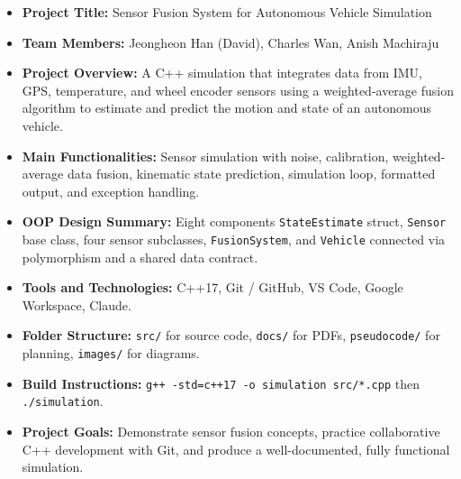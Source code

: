 \documentclass[a4paper,11pt]{article}
\begin{document}
\begin{itemize}[leftmargin=1.5cm]
\item \textbf{Project Title:} Sensor Fusion System for Autonomous Vehicle Simulation
\item \textbf{Team Members:} Jeongheon Han (David), Charles Wan, Anish Machiraju
\item \textbf{Project Overview:} A C++ simulation that integrates data from IMU, GPS, temperature, and wheel encoder sensors using a weighted-average fusion algorithm to estimate and predict the motion and state of an autonomous vehicle.
\item \textbf{Main Functionalities:} Sensor simulation with noise, calibration, weighted-average data fusion, kinematic state prediction, simulation loop, formatted output, and exception handling.
\item \textbf{OOP Design Summary:} Eight components \texttt{StateEstimate} struct, \texttt{Sensor} base class, four sensor subclasses, \texttt{FusionSystem}, and \texttt{Vehicle} connected via polymorphism and a shared data contract.
\item \textbf{Tools and Technologies:} C++17, Git / GitHub, VS Code, Google Workspace, Claude.
\item \textbf{Folder Structure:} \texttt{src/} for source code, \texttt{docs/} for PDFs, \texttt{pseudocode/} for planning, \texttt{images/} for diagrams.
\item \textbf{Build Instructions:} \texttt{g++ -std=c++17 -o simulation src/*.cpp} then \texttt{./simulation}.
\item \textbf{Project Goals:} Demonstrate sensor fusion concepts, practice collaborative C++ development with Git, and produce a well-documented, fully functional simulation.
\end{itemize}
\end{document}
